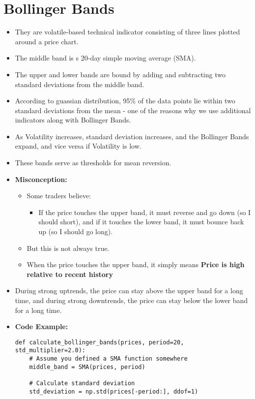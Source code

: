 \documentclass{article}
\begin{document}
\section*{Bollinger Bands}
\begin{itemize}
    \item They are volatile-based technical indicator consisting of three lines plotted around a price chart.
    \item The middle band is s 20-day simple moving average (SMA).
    \item The upper and lower bands are bound by adding and subtracting two standard deviations from the middle band. 
    \item According to guassian distribution, 95\% of the data points lie within two standard deviations from the mean - one of the reasons why we use additional indicators along with Bollinger Bands.
    \item As Volatility increases, standard deviation increases, and the Bollinger Bands expand, and vice versa if Volatility is low.
    \item These bands serve as thresholds for mean reversion.
    \item \textbf{Misconception:} 
    \begin{itemize}
        \item Some traders believe:
        \begin{itemize}
            \item If the price touches the upper band, it must reverse and go down (so I should short), and if it touches the lower band, it must bounce back up (so I should go long).
        \end{itemize}
        \item But this is not always true. 
        \item When the price touches the upper band, it simply means \textbf{Price is high relative to recent history}
    \end{itemize}
    \item During strong uptrends, the price can stay above the upper band for a long time, and during strong downtrends, the price can stay below the lower band for a long time.
    \item \textbf{Code Example:}
    \begin{lstlisting}
def calculate_bollinger_bands(prices, period=20, std_multiplier=2.0):
    # Assume you defined a SMA function somewhere
    middle_band = SMA(prices, period)
    
    # Calculate standard deviation
    std_deviation = np.std(prices[-period:], ddof=1)
    

\end{lstlisting}
\end{itemize}
\end{document}
